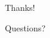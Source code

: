 \documentclass[final]{beamer}
\begin{document}

\begin{frame}

\centering

Thanks!

\vspace{1cm}

Questions?

\end{frame}
\end{document}
